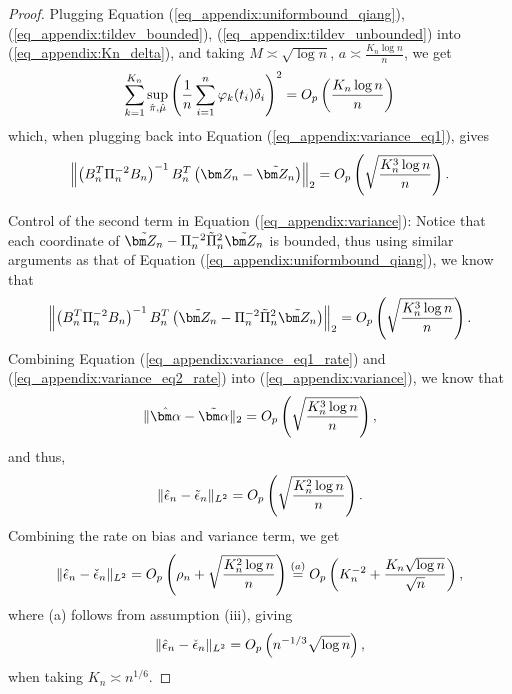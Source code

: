 \begin{proof}
Plugging Equation (\ref{eq_appendix:uniformbound_qiang}), (\ref{eq_appendix:tildev_bounded}), (\ref{eq_appendix:tildev_unbounded}) into (\ref{eq_appendix:Kn_delta}), and taking $M\asymp\sqrt{\log n}$, $a\asymp \frac{K_n\log n}{n}$, we get
\begin{equation}
\sum_{k=1}^{K_n}\sup_{\hat{\pi},\hat\mu}\left(\frac{1}{n}\sum_{i=1}^n\varphi_k(t_i)\delta_i\right)^2
=O_p\left(\frac{K_n\log n}{n}\right)
\end{equation}
which, when plugging back into Equation (\ref{eq_appendix:variance_eq1}), gives
\begin{align}\label{eq_appendix:variance_eq1_rate}
\left\|\left(B_n^T\Pi_n^{-2}B_n\right)^{-1}B_n^T\left(\Zn-\tilde\Zn\right)\right\|_2
=\O_p\left(\sqrt{\frac{K_n^3\log n}{n}}\right).
\end{align}

Control of the second term in Equation (\ref{eq_appendix:variance}):
Notice that each coordinate of $\tilde\Zn-\Pi_n^{-2}\tilde\Pi_n^2\tilde\Zn$ is bounded, thus using similar arguments as that of Equation (\ref{eq_appendix:uniformbound_qiang}), we know that
\begin{align}\label{eq_appendix:variance_eq2_rate}
\left\|\left(B_n^T\Pi_n^{-2}B_n\right)^{-1}B_n^T\left(\tilde\Zn-\Pi_n^{-2}\tilde\Pi_n^2\tilde\Zn\right)\right\|_2
=\O_p\left(\sqrt{\frac{K_n^3\log n}{n}}\right).
\end{align}
Combining Equation (\ref{eq_appendix:variance_eq1_rate}) and (\ref{eq_appendix:variance_eq2_rate}) into (\ref{eq_appendix:variance}), we know that
\begin{align*}
\|\hat{\bm\alpha}-\tilde{\bm\alpha}\|_2   
=\O_p\left(\sqrt{\frac{K_n^3\log n}{n}}\right),
\end{align*}
and thus,
\begin{align}
\|\hat\epsilon_n-\tilde\epsilon_n\|_{L^2}
=O_p\left(\sqrt{\frac{K_n^2\log n}{n}}\right).
\end{align}
Combining the rate on bias and variance term, we get
$$
\|\hat{\epsilon}_n-\check\epsilon_n\|_{L^2}
=O_p\left(\rho_n+\sqrt{\frac{K_n^2\log n}{n}}\right)
\stackrel{(a)}{=}O_p\left(K_n^{-2}+\frac{K_n\sqrt{\log n}}{\sqrt{n}}\right),
$$
where (a) follows from assumption (iii), giving
$$
\|\hat{\epsilon}_n-\check\epsilon_n\|_{L^2}
=O_p\left(n^{-1/3}\sqrt{\log n}\right),
$$
when taking $K_n\asymp n^{1/6}$.
\end{proof}




